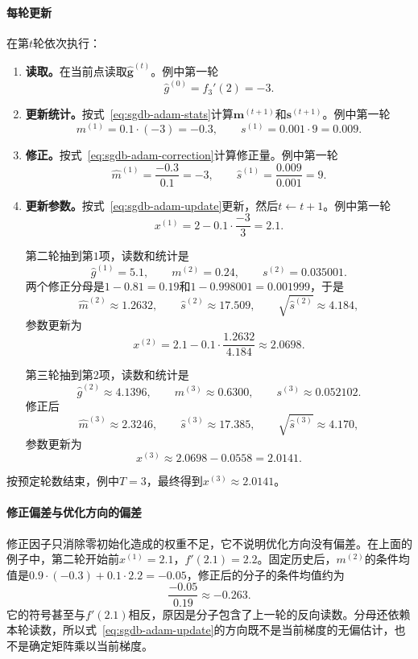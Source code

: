 \paragraph{每轮更新}
在第$t$轮依次执行：
\begin{enumerate}
 \item \textbf{读取。}在当前点读取$\hat{\bm g}^{(t)}$。例中第一轮
 \[
  \hat g^{(0)}=f_3'(2)=-3.
 \]
 \item \textbf{更新统计。}按式~\eqref{eq:sgdb-adam-stats}计算$\bm{m}^{(t+1)}$和$\bm{s}^{(t+1)}$。例中第一轮
 \[
  m^{(1)}=0.1\cdot(-3)=-0.3,\qquad s^{(1)}=0.001\cdot9=0.009.
 \]
 \item \textbf{修正。}按式~\eqref{eq:sgdb-adam-correction}计算修正量。例中第一轮
 \[
  \hat m^{(1)}=\frac{-0.3}{0.1}=-3,\qquad \hat s^{(1)}=\frac{0.009}{0.001}=9.
 \]
 \item \textbf{更新参数。}按式~\eqref{eq:sgdb-adam-update}更新，然后$t\leftarrow t+1$。例中第一轮
 \[
  x^{(1)}=2-0.1\cdot\frac{-3}{3}=2.1.
 \]

 第二轮抽到第$1$项，读数和统计是
 \[
  \hat g^{(1)}=5.1,\qquad m^{(2)}=0.24,\qquad s^{(2)}=0.035001.
 \]
 两个修正分母是$1-0.81=0.19$和$1-0.998001=0.001999$，于是
 \[
  \hat m^{(2)}\approx1.2632,\qquad \hat s^{(2)}\approx17.509,\qquad \sqrt{\hat s^{(2)}}\approx4.184,
 \]
 参数更新为
 \[
  x^{(2)}=2.1-0.1\cdot\frac{1.2632}{4.184}\approx2.0698.
 \]

 第三轮抽到第$2$项，读数和统计是
 \[
  \hat g^{(2)}\approx4.1396,\qquad m^{(3)}\approx0.6300,\qquad s^{(3)}\approx0.052102.
 \]
 修正后
 \[
  \hat m^{(3)}\approx2.3246,\qquad \hat s^{(3)}\approx17.385,\qquad \sqrt{\hat s^{(3)}}\approx4.170,
 \]
 参数更新为
 \[
  x^{(3)}\approx2.0698-0.0558=2.0141.
 \]
\end{enumerate}

按预定轮数结束，例中$T=3$，最终得到$x^{(3)}\approx2.0141$。

\paragraph{修正偏差与优化方向的偏差}
修正因子只消除零初始化造成的权重不足，它不说明优化方向没有偏差。在上面的例子中，第二轮开始前$x^{(1)}=2.1$，$f'(2.1)=2.2$。固定历史后，$m^{(2)}$的条件均值是$0.9\cdot(-0.3)+0.1\cdot2.2=-0.05$，修正后的分子的条件均值约为
\[
 \frac{-0.05}{0.19}\approx-0.263 .
\]
它的符号甚至与$f'(2.1)$相反，原因是分子包含了上一轮的反向读数。分母还依赖本轮读数，所以式~\eqref{eq:sgdb-adam-update}的方向既不是当前梯度的无偏估计，也不是确定矩阵乘以当前梯度。

